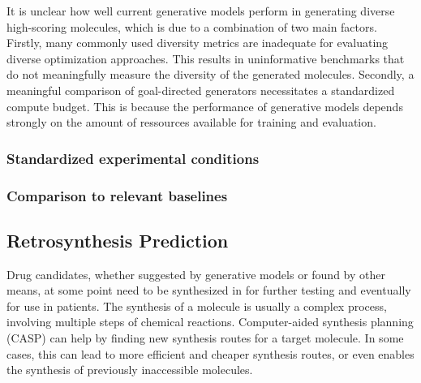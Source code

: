 It is unclear how well current generative models perform in generating diverse
high-scoring molecules, which is due to a combination of two main factors. 
Firstly, many commonly used diversity metrics are inadequate for evaluating
diverse optimization approaches. This results in uninformative benchmarks that
do not meaningfully measure the diversity of the generated molecules. Secondly,
a meaningful comparison of goal-directed generators necessitates a standardized
compute budget. This is because the performance of generative models depends strongly 
on the amount of ressources available for training and evaluation.

\subsubsection{Standardized experimental conditions}

\subsubsection{Comparison to relevant baselines}



\subsection{Retrosynthesis Prediction\label{sec:retrosynthesis}}
Drug candidates, whether suggested by generative models or found by other means,
at some point need to be synthesized in for further testing and 
eventually for use in patients. The synthesis of a molecule is usually a complex
process, involving multiple steps of chemical reactions. Computer-aided synthesis 
planning (CASP) can help by finding new synthesis routes for a target molecule.
In some cases, this can lead to more efficient and cheaper synthesis routes, or
even enables the synthesis of previously inaccessible molecules.

